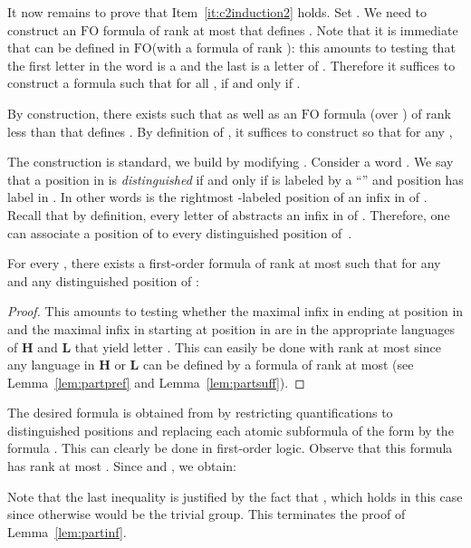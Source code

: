 \documentclass{CSML}
\newcommand\Lb{\ensuremath{\mathbf{L}}\xspace}
\newcommand\Hb{\ensuremath{\mathbf{H}}\xspace}
\newcommand{\fo}{\ensuremath{\text{FO}}\xspace}
\theoremstyle{plain}
\begin{document}
It now remains to prove that Item~\ref{it:c2induction2} holds. Set . We need to construct an \fo formula of rank at most  that defines . Note that it is
immediate that  can be defined in \fo (with a formula of
rank ): this amounts to testing that the first letter in the word
is a  and the last is a letter of . Therefore it suffices to
construct a formula  such that for all ,
 if and only if .

By construction, there exists  such that  as well as an
\fo formula  (over \frB) of rank less than  that defines . By definition of , it
suffices to construct  so that for any ,

The construction is standard, we build  by modifying
. Consider a word . We say that a position
 in  is \emph{distinguished} if and only if  is labeled by
a ``'' and position  has label in . In other words  is
the rightmost -labeled position of an infix in  of .
Recall that by definition, every letter of  abstracts an
infix in  of . Therefore, one can associate a position
 of  to every distinguished position  of~.

\begin{fact} \label{fct:defalpha}
For every , there exists a first-order formula
 of rank at most  such that for any  and any
distinguished position  of :

\end{fact}

\begin{proof}
This amounts to testing whether the maximal infix in  ending
at position  in  and the maximal infix in  starting at
position  in  are in the appropriate languages of \Hb and
\Lb that yield letter . This can easily be done with rank at most  since any language in \Hb or \Lb can be defined
by a formula of rank at most  (see
Lemma~\ref{lem:partpref} and Lemma~\ref{lem:partsuff}).
\end{proof}

The desired formula  is obtained from  by
restricting quantifications to distinguished positions and replacing
each atomic subformula of the form  by the formula
. This can clearly be done in first-order
logic. Observe that this formula has rank at most .
Since  and , we obtain:

Note that the last inequality is justified by the fact that
, which holds in this case since otherwise  would be the trivial group. This terminates the proof of Lemma~\ref{lem:partinf}.
\end{document}

